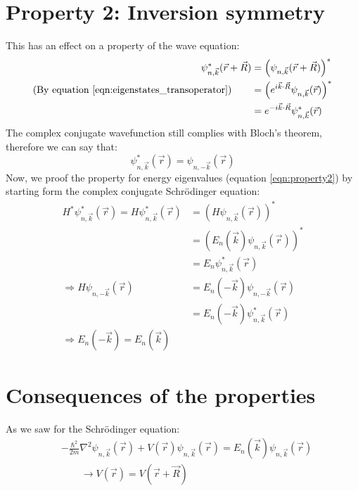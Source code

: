 \section{Property 2: Inversion symmetry} \label{sec:property2}
This has an effect on a property of the wave equation:
\begin{align}
	\psi_{n, \vec{k}}^{*}(\vec{r} + \vec{R}) &= \left(\psi_{n, \vec{k}}(\vec{r} + \vec{R})\right)^{*} \\
	\text{(By equation \ref{eqn:eigenstates_transoperator})}\qquad &= \left(e^{i\vec{k}\cdot\vec{R}}\psi_{n, \vec{k}}(\vec{r})\right)^{*} \\
	&= e^{-i\vec{k}\cdot\vec{R}}\psi_{n, \vec{k}}^{*}(\vec{r})
\end{align}
The complex conjugate wavefunction still complies with Bloch's theorem, therefore we can say that:
\begin{equation}
	\psi_{n, \vec{k}}^{*}(\vec{r}) = \psi_{n, -\vec{k}}(\vec{r})
\end{equation}
Now, we proof the property for energy eigenvalues (equation \ref{eqn:property2}) by starting form the complex conjugate Schrödinger equation:
\begin{align}
	H^{*}\psi_{n, \vec{k}}^{*}(\vec{r}) = H\psi_{n, \vec{k}}^{*}(\vec{r}) &= \left(H\psi_{n, \vec{k}}(\vec{r})\right)^{*} \\
	&= \left(E_n(\vec{k})\psi_{n, \vec{k}}(\vec{r})\right)^{*} \\
	&= E_n\psi_{n, \vec{k}}^{*}(\vec{r}) \\
	\Rightarrow H\psi_{n, -\vec{k}}(\vec{r}) &= E_n(-\vec{k})\psi_{n, -\vec{k}}(\vec{r}) \\
	&= E_n(-\vec{k})\psi_{n, \vec{k}}^{*}(\vec{r}) \\
	\Rightarrow E_n(-\vec{k}) = E_n(\vec{k}) \nonumber
\end{align}

\section{Consequences of the properties}
As we saw for the Schrödinger equation:
\begin{align}
    &-\frac{\hbar^2}{2m}\nabla^2\psi_{n, \vec{k}}(\vec{r}) + V(\vec{r})\psi_{n, \vec{k}}(\vec{r}) = E_n(\vec{k})\psi_{n, \vec{k}}(\vec{r}) \\
    & \qquad \rightarrow V(\vec{r}) = V(\vec{r} + \vec{R})
\end{align}

